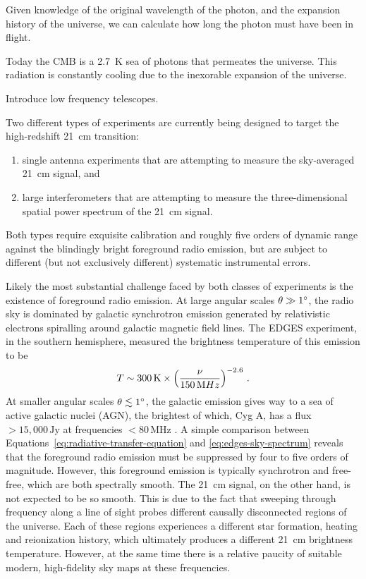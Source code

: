 \begin{bibunit}
Given knowledge of the
original wavelength of the photon, and the expansion history of the universe, we can calculate how
long the photon must have been in flight.


Today the CMB is a 2.7~K sea of photons that permeates the universe. This radiation is constantly
cooling due to the inexorable expansion of the universe.


Introduce low frequency telescopes.

Two different types of experiments are currently being designed to target the high-redshift 21~cm
transition:
\begin{enumerate}
    \item single antenna experiments that are attempting to measure the sky-averaged 21~cm signal,
        and
    \item large interferometers that are attempting to measure the three-dimensional spatial power
        spectrum of the 21~cm signal.
\end{enumerate}
Both types require exquisite calibration and roughly five orders of dynamic range against the
blindingly bright foreground radio emission, but are subject to different (but not exclusively
different) systematic instrumental errors.

Likely the most substantial challenge faced by both classes of experiments is the existence of
foreground radio emission. At large angular scales $\theta \gg 1\arcdeg$, the radio sky is dominated
by galactic synchrotron emission generated by relativistic electrons spiralling around galactic
magnetic field lines. The EDGES experiment, in the southern hemisphere, measured the brightness
temperature of this emission to be \citep{2017MNRAS.464.4995M}
\begin{equation}\label{eq:edges-sky-spectrum}
    T \sim 300\,{\rm K} \times \left(\frac{\nu}{150\,{\rm MHz}}\right)^{-2.6}\,.
\end{equation}
At smaller angular scales $\theta \lesssim 1\arcdeg$, the galactic emission gives way to a sea of
active galactic nuclei (AGN), the brightest of which, Cyg A, has a flux $>15,000\,\text{Jy}$ at
frequencies $<80\,\text{MHz}$ \citep{1977A&A....61...99B}. A simple comparison between
Equations~\ref{eq:radiative-transfer-equation} and \ref{eq:edges-sky-spectrum} reveals that the
foreground radio emission must be suppressed by four to five orders of magnitude.  However, this
foreground emission is typically synchrotron and free-free, which are both spectrally smooth. The
21~cm signal, on the other hand, is not expected to be so smooth. This is due to the fact that
sweeping through frequency along a line of sight probes different causally disconnected regions of
the universe. Each of these regions experiences a different star formation, heating and reionization
history, which ultimately produces a different 21~cm brightness temperature.  However, at the same
time there is a relative paucity of suitable modern, high-fidelity sky maps at these frequencies.


\end{bibunit}
